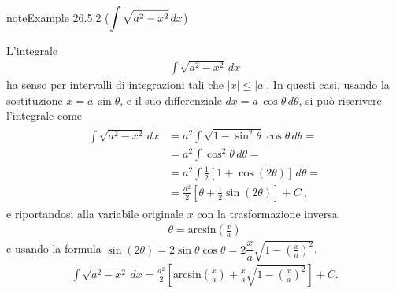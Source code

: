 \documentclass[letterpaper,10pt,italian]{jupyterBook}
\begin{document}
\begin{sphinxadmonition}{note}{Example 26.5.2 (\protect\(\displaystyle \int \sqrt{a^2 - x^2} \,  dx\protect\))}



\sphinxAtStartPar
L’integrale
\begin{equation*}
\begin{split}\int \sqrt{a^2 - x^2} \,  dx\end{split}
\end{equation*}
\sphinxAtStartPar
ha senso per intervalli di integrazioni tali che \(|x| \le |a|\). In questi casi, usando la sostituzione \(x = a \, \sin \theta\), e il suo differenziale \(dx = a \, \cos \theta \, d \theta\), si può riscrivere l’integrale come
\begin{equation*}
\begin{split}\begin{aligned}
  \int \sqrt{a^2 - x^2} \, dx
   & = a^2 \int \sqrt{1- \sin^2 \theta} \cos \theta \, d \theta = \\
   & = a^2 \int \cos^2 \theta \, d \theta = \\
   & = a^2 \int \frac{1}{2} \left[ 1 + \cos \left( 2 \theta \right) \right] \, d \theta = \\
   & = \frac{a^2}{2} \left[ \theta + \frac{1}{2} \sin \left( 2 \theta \right) \right] + C \ ,
\end{aligned}\end{split}
\end{equation*}
\sphinxAtStartPar
e riportandosi alla variabile originale \(x\) con la trasformazione inversa
\begin{equation*}
\begin{split} \theta = \text{arcsin} \left(\frac{x}{a}\right) \end{split}
\end{equation*}
\sphinxAtStartPar
e usando la formula \(\sin( 2 \theta ) = 2 \sin \theta \cos \theta = 2 \dfrac{x}{a} \sqrt{1 - \left( \frac{x}{a} \right)^2}\),
\begin{equation*}
\begin{split}\int \sqrt{a^2 - x^2} \, dx = \frac{a^2}{2} \left[ \text{arcsin}\left( \frac{x}{a} \right) + \frac{x}{a}\sqrt{1 - \left( \frac{x}{a} \right)^2 }\right] + C .\end{split}
\end{equation*}\end{sphinxadmonition}
\label{ch/infinitesimal_calculus/integrals:integrals-methods-sub-2}
\end{document}
